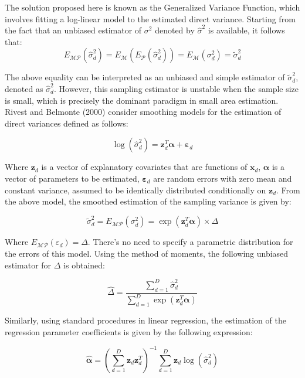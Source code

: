 \documentclass[
  12pt,
]{book}
\begin{document}
The solution proposed here is known as the Generalized Variance Function, which involves fitting a log-linear model to the estimated direct variance. Starting from the fact that an unbiased estimator of \(\sigma^2\) denoted by \(\hat{\sigma}^2\) is available, it follows that:
\[
E_{\mathscr{MP}}\left(\hat{\sigma}_{d}^{2}\right)=E_{\mathscr{M}}\left(E_{\mathscr{P}}\left(\hat{\sigma}_{d}^{2}\right)\right)=E_{\mathscr{M}}\left(\sigma_{d}^{2}\right)=\tilde{\sigma}_{d}^{2}
\]

The above equality can be interpreted as an unbiased and simple estimator of \(\tilde{\sigma}_{d}^{2}\), denoted as \(\hat{\sigma}_{d}^{2}\). However, this sampling estimator is unstable when the sample size is small, which is precisely the dominant paradigm in small area estimation. Rivest and Belmonte (2000) consider smoothing models for the estimation of direct variances defined as follows:

\[
\log\left(\hat{\sigma}_{d}^{2}\right)=\boldsymbol{z}_{d}^{T}\boldsymbol{\alpha}+\boldsymbol{\varepsilon}_{d}
\]

Where \(\boldsymbol{z}_{d}\) is a vector of explanatory covariates that are functions of \(\boldsymbol{x}_{d}\), \(\boldsymbol{\alpha}\) is a vector of parameters to be estimated, \(\boldsymbol{\varepsilon}_{d}\) are random errors with zero mean and constant variance, assumed to be identically distributed conditionally on \(\boldsymbol{z}_{d}\). From the above model, the smoothed estimation of the sampling variance is given by:

\[
\tilde{\sigma}_{d}^{2}=E_{\mathscr{MP}}\left(\sigma_{d}^{2}\right)=\exp\left(\boldsymbol{z}_{d}^{T}\boldsymbol{\alpha}\right)\times\Delta
\]

Where \(E_{\mathscr{MP}}\left(\varepsilon_{d}\right)=\Delta\). There's no need to specify a parametric distribution for the errors of this model. Using the method of moments, the following unbiased estimator for \(\Delta\) is obtained:

\[
\hat{\Delta}=\frac{\sum_{d=1}^{D}\hat{\sigma}_{d}^{2}}{\sum_{d=1}^{D}\exp\left(\boldsymbol{z}_{d}^{T}\boldsymbol{\alpha}\right)}
\]

Similarly, using standard procedures in linear regression, the estimation of the regression parameter coefficients is given by the following expression:

\[
\hat{\boldsymbol{\alpha}}=\left(\sum_{d=1}^{D}\boldsymbol{z}_{d}\boldsymbol{z}_{d}^{T}\right)^{-1}\sum_{d=1}^{D}\boldsymbol{z}_{d}\log\left(\hat{\sigma}_{d}^{2}\right)
\]
\end{document}
